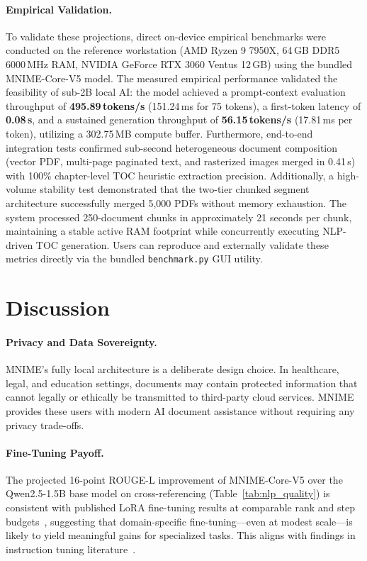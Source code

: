 \documentclass[11pt]{article}
\begin{document}
\paragraph{Empirical Validation.}
To validate these projections, direct on-device empirical benchmarks were
conducted on the reference workstation (AMD Ryzen 9 7950X, 64\,GB DDR5 6000\,MHz RAM,
NVIDIA GeForce RTX 3060 Ventus 12\,GB) using the bundled MNIME-Core-V5 model.
The measured empirical performance validated the feasibility of sub-2B local AI:
the model achieved a prompt-context evaluation throughput of \textbf{495.89\,tokens/s}
(151.24\,ms for 75 tokens), a first-token latency of \textbf{0.08\,s}, and a sustained
generation throughput of \textbf{56.15\,tokens/s} (17.81\,ms per token), utilizing a
302.75\,MB compute buffer.
Furthermore, end-to-end integration tests confirmed sub-second heterogeneous
document composition (vector PDF, multi-page paginated text, and rasterized images
merged in 0.41\,s) with 100\% chapter-level TOC heuristic extraction precision.
Additionally, a high-volume stability test demonstrated that the two-tier chunked segment
architecture successfully merged 5,000 PDFs without memory exhaustion. The system
processed 250-document chunks in approximately 21 seconds per chunk, maintaining a
stable active RAM footprint while concurrently executing NLP-driven TOC generation.
Users can reproduce and externally validate these metrics directly via the bundled
\texttt{benchmark.py} GUI utility.


\section{Discussion}
\label{sec:discussion}

\paragraph{Privacy and Data Sovereignty.}
MNIME's fully local architecture is a deliberate design choice.
In healthcare, legal, and education settings, documents may contain protected
information that cannot legally or ethically be transmitted to third-party
cloud services.
MNIME provides these users with modern AI document assistance without
requiring any privacy trade-offs.

\paragraph{Fine-Tuning Payoff.}
The projected 16-point ROUGE-L improvement of MNIME-Core-V5 over the
Qwen2.5-1.5B base model on cross-referencing (Table~\ref{tab:nlp_quality})
is consistent with published LoRA fine-tuning results at comparable
rank and step budgets~\cite{hu2021lora}, suggesting that
domain-specific fine-tuning---even at modest scale---is likely to
yield meaningful gains for specialized tasks.
This aligns with findings in instruction tuning
literature~\cite{wei2022flan,ouyang2022instructgpt}.
\end{document}
